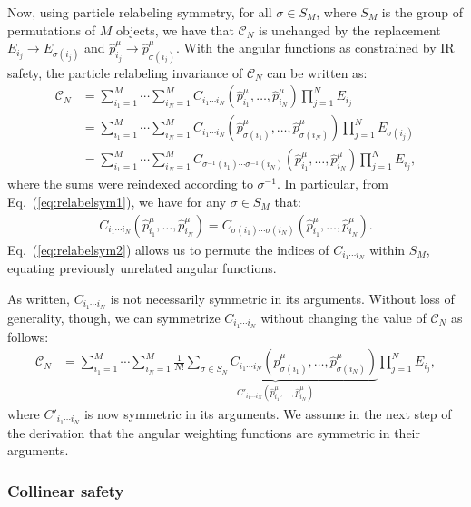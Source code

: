 \documentclass[letterpaper,11pt]{article}
\DeclareRobustCommand{\Eq}[1]{Eq.~(\ref{#1})}
\begin{document}
Now, using particle relabeling symmetry, for all $\sigma\in S_M$, where $S_M$ is the group of permutations of $M$ objects, we have that $\mathcal C_N$ is unchanged by the replacement $E_{i_j} \to E_{\sigma(i_j)}$ and $\hat p^\mu_{i_j} \to \hat p^\mu_{\sigma(i_j)}$.
%
With the angular functions as constrained by IR safety, the particle relabeling invariance of $\mathcal C_N$ can be written as:
\begin{align}\label{eq:updatedCn}
\mathcal C_N&=\sum_{i_1=1}^M\cdots\sum_{i_N=1}^MC_{i_1\cdots i_N}(\hat p_{i_1}^\mu,\ldots,\hat p_{i_N}^\mu)\prod_{j=1}^NE_{i_j}\\
&=\sum_{i_1=1}^M\cdots\sum_{i_N=1}^MC_{i_1\cdots i_N}(\hat p_{\sigma(i_1)}^\mu,\ldots, \hat p_{\sigma(i_N)}^\mu)\prod_{j=1}^NE_{\sigma(i_j)}\nonumber
\\&=\sum_{i_1=1}^M\cdots\sum_{i_N=1}^MC_{\sigma^{-1}(i_1)\cdots \sigma^{-1}(i_N)}(\hat p_{i_1}^\mu ,\ldots,\hat p_{i_N}^\mu)\prod_{j=1}^NE_{i_j},\label{eq:relabelsym1}
\end{align}
where the sums were reindexed according to $\sigma^{-1}$. In particular, from \Eq{eq:relabelsym1}, we have for any $\sigma \in S_M$ that:
\begin{align}\label{eq:relabelsym2}
C_{i_1\cdots i_N}(\hat p_{i_1}^\mu,\ldots,\hat p_{i_N}^\mu)=C_{\sigma(i_1)\cdots \sigma(i_N)}(\hat p_{i_1}^\mu,\ldots, \hat p_{i_N}^\mu).
\end{align}
%
\Eq{eq:relabelsym2} allows us to permute the indices of $C_{i_1\cdots i_N}$ within $S_M$, equating previously unrelated angular functions.

As written, $C_{i_1\cdots i_N}$ is not necessarily symmetric in its arguments.
%
Without loss of generality, though, we can symmetrize $C_{i_1\cdots i_N}$ without changing the value of $\mathcal C_N$ as follows:
\begin{align}\label{eq:symf}
\mathcal C_N&=\sum_{i_1=1}^M\cdots\sum_{i_N=1}^M\underbrace{\frac{1}{N!}\sum_{\sigma\in S_N}C_{i_1\cdots i_N}(\hat p_{\sigma(i_1)}^\mu,\ldots,\hat p_{\sigma(i_N)}^\mu)}_{C'_{i_1\cdots i_N}(\hat p_{i_1}^\mu,\ldots,\hat p_{i_N}^\mu)}\prod_{j=1}^NE_{i_j},
\end{align}
where $C'_{i_1\cdots i_N}$ is now symmetric in its arguments.
%
We assume in the next step of the derivation that the angular weighting functions are symmetric in their arguments.


\subsubsection{Collinear safety}
\label{sec:collinearsafety}
\end{document}
